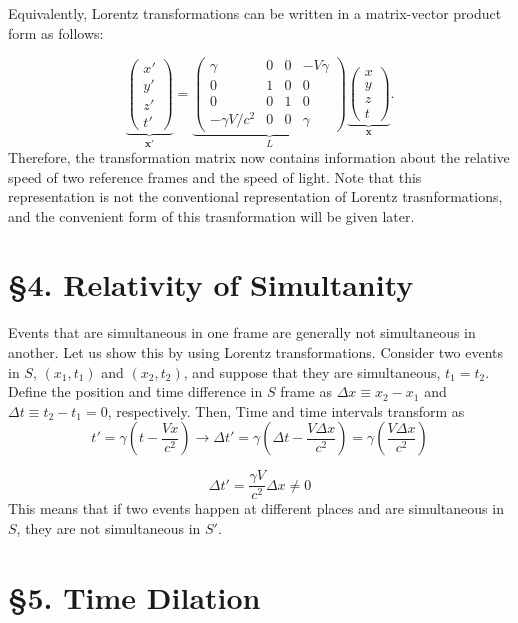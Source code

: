 \documentclass[12pt]{article}
\begin{document}
Equivalently, Lorentz transformations can be written in a matrix-vector product form as follows:

\[
\underbrace{\begin{pmatrix}
x'\\
y'\\
z'\\
t'
\end{pmatrix}}_{\mathbf{x'}}
=
\underbrace{\begin{pmatrix}
\gamma & 0 & 0 & -V\gamma\\
0 & 1 & 0 & 0\\
0 & 0 & 1 & 0\\
-\gamma V/c^2 & 0 & 0 & \gamma
\end{pmatrix}}_{L}
\underbrace{\begin{pmatrix}
x\\
y\\
z\\
t
\end{pmatrix}}_{\mathbf{x}}.
\]
Therefore, the transformation matrix now contains information about the relative speed of two reference frames and the speed of light. Note that this representation is not the conventional representation of Lorentz trasnformations, and the convenient form of this trasnformation will be given later.

\section*{§4. Relativity of Simultanity}
Events that are simultaneous in one frame are generally not simultaneous in another. Let us show this by using Lorentz transformations. Consider two events in $S$, $(x_1,t_1)$ and $(x_2,t_2)$, and suppose that they are simultaneous, $t_1=t_2$. Define the position and time difference in $S$ frame as $\Delta x \equiv x_2-x_1$ and $\Delta t \equiv t_2-t_1 = 0$, respectively. Then, Time and time intervals transform as 
\[
t' = \gamma \left( t - \frac{Vx}{c^2} \right) \rightarrow \Delta t' = \gamma \left( \Delta t - \frac{V\Delta x}{c^2} \right) =\gamma \left( \frac{V\Delta x}{c^2} \right) 
\]

\[
\Delta t' = \frac{\gamma V}{c^2}\Delta x \neq 0 
\]
This means that if two events happen at different places and are simultaneous in $S$, they are not simultaneous in $S'$.


\section*{§5. Time Dilation}
\end{document}
